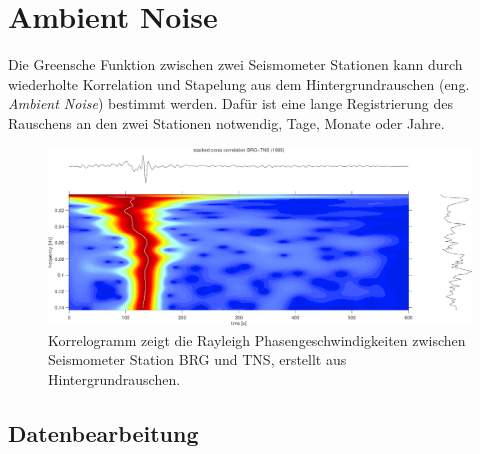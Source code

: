 \section{Ambient Noise}
Die Greensche Funktion zwischen zwei Seismometer Stationen kann durch wiederholte Korrelation und Stapelung aus dem Hintergrundrauschen (eng. \textsl{Ambient Noise}) bestimmt werden. Dafür ist eine lange Registrierung des Rauschens an den zwei Stationen notwendig, Tage, Monate oder Jahre.

\begin{figure}[h!]
\centering
\includegraphics[width=.9\tw]{fig/07-Korrelation/ambient_noise-BRG_TNS_cross.png}
\caption{Korrelogramm zeigt die Rayleigh Phasengeschwindigkeiten zwischen Seismometer Station BRG und TNS, erstellt aus Hintergrundrauschen.}
\end{figure}

\subsection{Datenbearbeitung}
